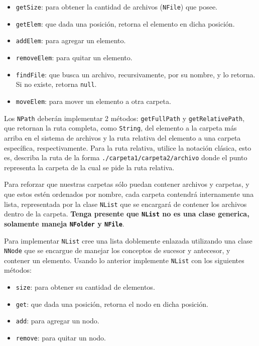 \documentclass[11pt,spanish,letterpaper]{report}
\begin{document}
\begin{itemize}
 	\item {\tt getSize}: para obtener la cantidad de archivos ({\tt NFile}) que posee.
 	\item {\tt getElem}: que dada una posición, retorna el elemento en dicha posición.
 	\item {\tt addElem}: para agregar un elemento.
 	\item {\tt removeElem}: para quitar un elemento.
 	\item {\tt findFile}: que busca un archivo, recursivamente, por su nombre, y lo retorna. Si no existe, retorna {\tt null}.
 	\item {\tt moveElem}: para mover un elemento a otra carpeta.
\end{itemize} 

Los {\tt NPath} deberán implementar 2 métodos: {\tt getFullPath} y {\tt getRelativePath}, que retornan la ruta completa, como {\tt String}, del elemento a la carpeta más arriba en el sistema de archivos y la ruta relativa del elemento a una carpeta específica, respectivamente. Para la ruta relativa, utilice la notación clásica, esto es, describa la ruta de la forma {\tt ./carpeta1/carpeta2/archivo} donde el punto representa la carpeta de la cual se pide la ruta relativa.

Para reforzar que nuestras carpetas sólo puedan contener archivos y carpetas, y que estos estén ordenados por nombre, cada carpeta contendrá internamente una lista, representada por la clase {\tt NList} que se encargará de contener los archivos dentro de la carpeta. \textbf{Tenga presente que {\tt NList} no es una clase generica, solamente maneja {\tt NFolder} y {\tt NFile}}.

Para implementar {\tt NList} cree una lista doblemente enlazada utilizando una clase {\tt NNode} que se encargue de manejar los conceptos de sucesor y antecesor, y contener un elemento. Usando lo anterior implemente {\tt NList} con los siguientes métodos:

\begin{itemize}
 	\item {\tt size}: para obtener su cantidad de elementos.
 	\item {\tt get}: que dada una posición, retorna el nodo en dicha posición.
 	\item {\tt add}: para agregar un nodo.
 	\item {\tt remove}: para quitar un nodo.
\end{itemize}
\end{document}
